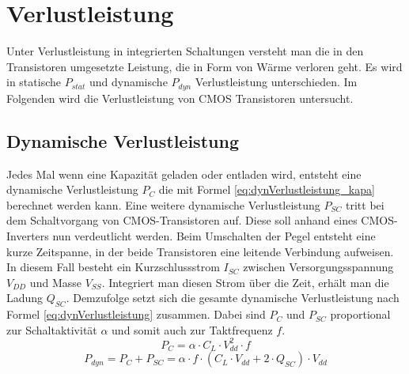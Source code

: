 
\section{Verlustleistung}
\label{sec:verlustleistung}
Unter Verlustleistung in integrierten Schaltungen versteht man die in den Transistoren umgesetzte Leistung, die in Form von Wärme verloren geht.
Es wird in statische \(P_{stat}\) und dynamische \(P_{dyn}\) Verlustleistung unterschieden. \cite[Seite 4 ff.]{flynn2007low} Im Folgenden wird die Verlustleistung von CMOS Transistoren untersucht.
\subsection{Dynamische Verlustleistung}\label{subsec:dynVerl}
Jedes Mal wenn eine Kapazität geladen oder entladen wird, entsteht eine dynamische Verlustleistung \(P_C\) die mit Formel \ref{eq:dynVerlustleistung_kapa} berechnet werden kann. Eine weitere dynamische Verlustleistung \(P_{SC}\) tritt bei dem Schaltvorgang von CMOS-Transistoren auf. Diese soll anhand eines CMOS-Inverters nun verdeutlicht werden. Beim Umschalten der Pegel entsteht eine kurze Zeitspanne, in der beide Transistoren eine leitende Verbindung aufweisen. In diesem Fall besteht ein Kurzschlussstrom \(I_{SC}\) zwischen Versorgungsspannung \(V_{DD}\) und Masse \(V_{SS}\). Integriert man diesen Strom über die Zeit, erhält man die Ladung $Q_{SC}$. Demzufolge setzt sich die gesamte dynamische Verlustleistung nach Formel \ref{eq:dynVerlustleistung} zusammen. Dabei sind \(P_C\) und \(P_{SC}\) proportional zur Schaltaktivität \(\alpha\) und somit auch zur Taktfrequenz $f$.\cite[Seite 4 ff.]{flynn2007low}
\begin{equation}
	P_{C} = \alpha \cdot C_L \cdot V_{dd}^{2} \cdot f
\label{eq:dynVerlustleistung_kapa}
\end{equation}
\begin{equation}
	P_{dyn} = P_{C} + P_{SC} = \alpha \cdot f \cdot (C_L \cdot V_{dd} + 2 \cdot Q_{SC}) \cdot V_{dd}
\label{eq:dynVerlustleistung}
\end{equation}

